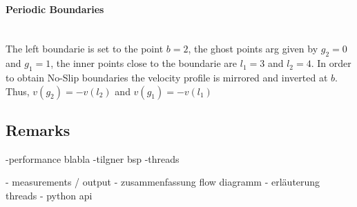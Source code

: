 \paragraph{Periodic Boundaries}\mbox{}\\

The left boundarie is set to the point $b=2$,
the ghost points arg given by $g_2=0$ and $g_1=1$, the inner points close
to the boundarie are $l_1=3$ and $l_2=4$.
In order to obtain No-Slip boundaries the velocity profile is mirrored and inverted
at $b$. Thus, $v(g_2) = -v(l_2)$ and  $v(g_1) = -v(l_1)$

\subsection{Remarks}

-performance blabla
-tilgner bsp
-threads

- measurements / output
- zusammenfassung flow diagramm
- erläuterung threads
- python api



